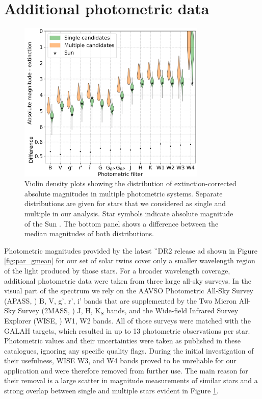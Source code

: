 \section{Additional photometric data}
\label{sec:data_triples}

\begin{figure}
	\centering
	\includegraphics[width=0.8\textwidth]{multimagplotebvc307.png}
	\caption{Violin density plots showing the distribution of extinction-corrected absolute magnitudes in multiple photometric systems. Separate distributions are given for stars that we considered as single and multiple in our analysis. Star symbols indicate absolute magnitude of the Sun \cite{2018ApJS..236...47W}. The bottom panel shows a difference between the median magnitudes of both distributions.}
	\label{fig:viol_photometry}
\end{figure}

Photometric magnitudes provided by the latest \G\ DR2 release \cite{2016A&A...595A...1G, 2018A&A...616A...1G} ad shown in Figure \ref{fig:par_gmean} for our set of solar twins cover only a smaller wavelength region of the light produced by those stars. For a broader wavelength coverage, additional photometric data were taken from three large all-sky surveys. In the visual part of the spectrum we rely on the AAVSO Photometric All-Sky Survey (APASS, \cite{2015AAS...22533616H}) B, V, g', r', i' bands that are supplemented by the Two Micron All-Sky Survey (2MASS, \cite{2006AJ....131.1163S}) J, H, K$_S$ bands, and the Wide-field Infrared Survey Explorer (WISE, \cite{2010AJ....140.1868W}) W1, W2 bands. All of those surveys were matched with the GALAH targets, which resulted in up to 13 photometric observations per star. Photometric values and their uncertainties were taken as published in these catalogues, ignoring any specific quality flags. During the initial investigation of their usefulness, WISE W3, and W4 bands proved to be unreliable for our application and were therefore removed from further use. The main reason for their removal is a large scatter in magnitude measurements of similar stars and a strong overlap between single and multiple stars evident in Figure \ref{fig:viol_photometry}.

